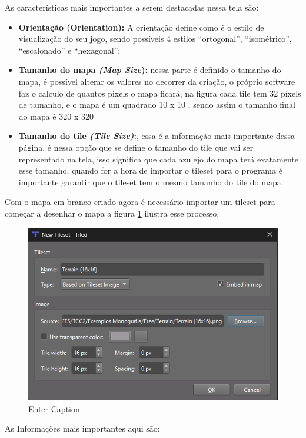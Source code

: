 As características mais importantes a serem destacadas nessa tela são:
\begin{itemize}
    \item \textbf{Orientação (Orientation):} A orientação define como é o estilo de visualização do seu jogo, sendo possíveis 4 estilos “ortogonal”, “isométrico”, “escalonado” e “hexagonal”;
    \item \textbf{Tamanho do mapa \textit{(Map Size}):} nessa parte é definido o tamanho do mapa, é possível alterar os valores no decorrer da criação, o próprio software faz o calculo de quantos pixels o mapa ficará, na figura cada tile tem 32 píxels de tamanho, e o mapa é um quadrado 10 x 10 , sendo assim o tamanho final do mapa é 320 x 320
    \item \textbf{Tamanho do tile \textit{(Tile Size)}:}, essa é a informação mais importante dessa página, é nessa opção que se define o tamanho do tile que vai ser representado na tela, isso significa que cada azulejo do mapa terá exatamente esse tamanho, quando for a  hora de importar o tileset para o programa é importante garantir que o  tileset tem o mesmo tamanho do tile do mapa.
\end{itemize}
Com o mapa em branco criado agora é necessário importar um tileset para começar a desenhar o mapa a figura \ref{fig:new-tileset}  ilustra esse processo.
\begin{figure}[h!]
    \centering
    \includegraphics[width=0.5\linewidth]{figuras/new-tileset.png}
    \caption{Enter Caption}
    \label{fig:new-tileset}
\end{figure}
As Informações mais importantes aqui são:
